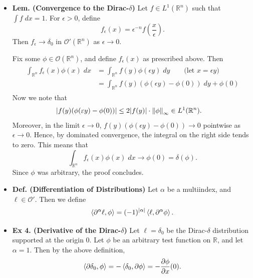 \documentclass{article}
\begin{document}
\begin{itemize}
		\item \textbf{Lem. (Convergence to the Dirac-$\delta$)} Let $f \in L^{1}(\mathbb{R}^{n})$ such that $\int f\;dx = 1$. For $\epsilon > 0$, define 
		\begin{equation}
			f_{\epsilon}(x) = \epsilon^{-n}f\left(\frac{x}{\epsilon}\right). 
		\end{equation}
		Then $f_{\epsilon} \to \delta_{0}$ in $\mathcal{O}'(\mathbb{R}^{n})$ as $\epsilon \to 0$. 
		
		{\color{blue}
			Fix some $\phi \in \mathcal{O}(\mathbb{R}^{n})$, and define $f_{\epsilon}(x)$ as prescribed above. Then 
			\begin{align}
				\begin{split}
					\int_{\mathbb{R}^{n}}f_{\epsilon}(x) \phi(x)\;dx &= \int_{\mathbb{R}^{n}}f(y)\phi(\epsilon y)\;dy \qquad \text{(let $x = \epsilon y$)}\\
					&= \int_{\mathbb{R}^{n}}f(y)(\phi(\epsilon y) - \phi(0))\;dy + \phi(0)
				\end{split}
			\end{align}
			Now we note that  
			\begin{align}
				\begin{split}
					|f(y)(\phi(\varepsilon y) - \phi(0))| &\leq 2|f(y)|\cdot \left\Vert \phi \right\Vert_{\infty} \in L^{1}(\mathbb{R}^{n}). 
				\end{split}
			\end{align}
			Moreover, in the limit $\epsilon \to 0$, $f(y)(\phi(\epsilon y) - \phi(0)) \to 0$ pointwise as $\epsilon \to 0$. Hence, by dominated convergence, the integral on the right side tends to zero. This means that 
			\begin{equation}
				\int_{\mathbb{R}^{n}}f_{\epsilon}(x)\phi(x)\;dx \to \phi(0) = \delta(\phi). 
			\end{equation}
			Since $\phi$ was arbitrary, the proof concludes. 
		} 
		
		\item \textbf{Def. (Differentiation of Distributions)} Let $\alpha$ be a multiindex, and $\ell \in \mathcal{O}'$. Then we define 
		\begin{equation}
			\braket{\partial^{\alpha}\ell, \phi} = (-1)^{|\alpha|}\braket{\ell, \partial^{\alpha}\phi}. 
		\end{equation}
		
		\item \textbf{Ex 4. (Derivative of the Dirac-$\delta$)} Let $\ell = \delta_{0}$ be the Dirac-$\delta$ distribution supported at the origin $0$. Let $\phi$ be an arbitrary test function on $\mathbb{R}$, and let $\alpha= 1$. Then by the above definition, 
		\begin{equation}
			\braket{\partial \delta_{0}, \phi} = -\braket{\delta_{0}, \partial \phi} = -\frac{\partial \phi}{\partial x}(0). 
		\end{equation}
		

\end{itemize}
\end{document}
